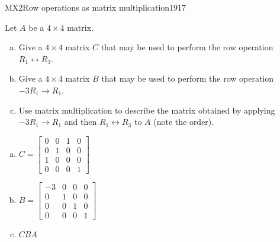 \begin{exercise}{MX2}{Row operations as matrix multiplication}{1917} 
\begin{exerciseStatement} 

Let \(A\) be a \(4 \times 4\) matrix.

 

\begin{enumerate}[(a)]
\item Give a \(4 \times 4\) matrix \(C\) that may be used to perform the row operation \(R_1 \leftrightarrow R_3\).
\item Give a \(4 \times 4\) matrix \(B\) that may be used to perform the row operation \(-3 R_1 \to R_1\).
\item Use matrix multiplication to describe the matrix obtained by applying \(-3 R_1 \to R_1\) and then \(R_1 \leftrightarrow R_3\) to \(A\) (note the order). 
\end{enumerate}

     \end{exerciseStatement}
 \begin{exerciseAnswer} 

\begin{enumerate}[(a)]
\item \(C=\left[\begin{array}{cccc}
0 & 0 & 1 & 0 \\
0 & 1 & 0 & 0 \\
1 & 0 & 0 & 0 \\
0 & 0 & 0 & 1
\end{array}\right]\)
\item \(B=\left[\begin{array}{cccc}
-3 & 0 & 0 & 0 \\
0 & 1 & 0 & 0 \\
0 & 0 & 1 & 0 \\
0 & 0 & 0 & 1
\end{array}\right]\)
\item  \(CBA\) 
\end{enumerate}

     \end{exerciseAnswer}
 \end{exercise}


